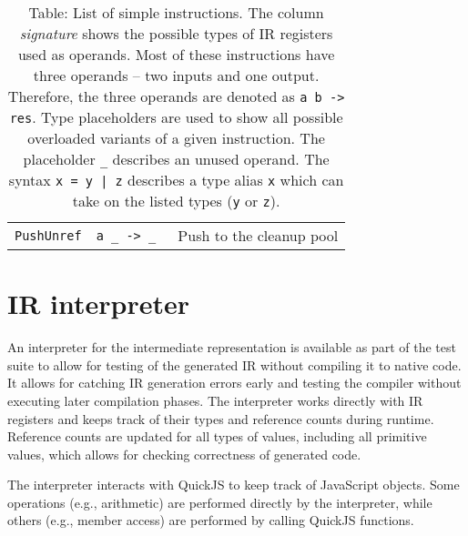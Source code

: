 \begin{table}
\begin{tabular}{l | l | l}
        \texttt{PushUnref}   & \texttt{a      \_    -> \_       } &  Push to the cleanup pool  \\
    \end{tabular}
    \caption{Table: List of simple instructions. The column \textit{signature} shows the possible types of IR registers used as operands. Most of these instructions have three operands -- two inputs and one output. Therefore, the three operands are denoted as \texttt{a b -> res}. Type placeholders are used to show all possible overloaded variants of a given instruction. The placeholder \texttt{\_} describes an unused operand. The syntax \texttt{x = y | z} describes a type alias \texttt{x} which can take on the listed types (\texttt{y} or \texttt{z}). }
    \label{tab:opcodes}
\end{table}


\section{IR interpreter}

An interpreter for the intermediate representation is available as part of the test suite to allow for testing of the generated IR without compiling it to native code. It allows for catching IR generation errors early and testing the compiler without executing later compilation phases. The interpreter works directly with IR registers and keeps track of their types and reference counts during runtime. Reference counts are updated for all types of values, including all primitive values, which allows for checking correctness of generated code.

The interpreter interacts with QuickJS to keep track of JavaScript objects. Some operations (e.g., arithmetic) are performed directly by the interpreter, while others (e.g., member access) are performed by calling QuickJS functions.
